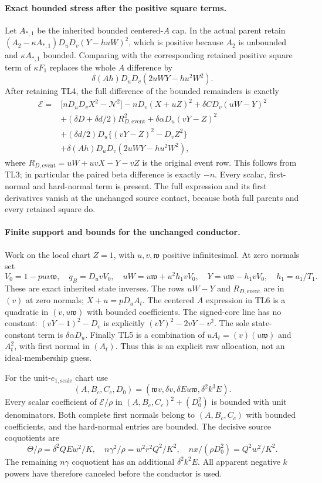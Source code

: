 \paragraph{Exact bounded stress after the positive square terms.}
Let $A_{*,1}$ be the inherited bounded centered-$A$ cap. In the actual
parent retain $(A_2-\kappa A_{*,1})D_uD_v(Y-huW)^2$, which is positive
because $A_2$ is unbounded and $\kappa A_{*,1}$ bounded. Comparing with
the corresponding retained positive square term of $\kappa F_1$ replaces the whole
$A$ difference by
\[
 \delta(Ah)D_uD_v(2uWY-hu^2W^2).
\]
After retaining TL4, the full difference of the bounded remainders is
exactly
\[
\begin{split}
 \mathscr E={}&\bigl[nD_uD_vX^2-\mathcal N^2\bigr]
   -nD_v(X+uZ)^2+\delta C D_v(uW-Y)^2\\
 &+(\delta D+\delta d/2)R_{D,\mathrm{event}}^2
   +\delta\alpha D_u(vY-Z)^2\\
 &+(\delta d/2)D_u\{(vY-Z)^2-D_vZ^2\}\\
 &+\delta(Ah)D_uD_v(2uWY-hu^2W^2),
\end{split}
\tag{TL6}
\]
where $R_{D,\mathrm{event}}=uW+uvX-Y-vZ$ is the original event
row. This follows from TL3; in particular the paired beta difference
is exactly $-n$. Every scalar, first-normal and hard-normal term is
present. The full expression and its first derivatives vanish at the
unchanged source contact, because both full parents and every retained
square do.

\paragraph{Finite support and bounds for the unchanged conductor.}
Work on the local chart $Z=1$, with $u,v,\mathfrak w$ positive
infinitesimal. At zero normals set
\[
 V_0=1-puv\mathfrak w,\quad q_B=D_uvV_0,\quad
 uW=u\mathfrak w+u^2h_1vV_0,\quad
 Y=u\mathfrak w-h_1vV_0,\quad h_1=a_1/T_1.
\tag{TL7}
\]
These are exact inherited state inverses. The rows $uW-Y$ and
$R_{D,\mathrm{event}}$ are in $(v)$ at zero normals;
$X+u=pD_uA_t$. The centered $A$ expression in TL6 is a quadratic
in $(v,u\mathfrak w)$ with bounded coefficients. The signed-core
line has no constant: $(vY-1)^2-D_v$ is explicitly
$(vY)^2-2vY-v^2$. The sole state-constant term is
$\delta\alpha D_u$. Finally TL5 is a combination of
$uA_t=(v)(u\mathfrak w)$ and $A_t^2$, with first normal in $(A_t)$.
Thus this is an explicit raw allocation, not an ideal-membership guess.

For the unit-$e_{1,\mathrm{scale}}$ chart use
\[
 (A,B_c,C_c,D_0)
 =(\mathfrak wv,\delta v,\delta E u\mathfrak w,\delta^2k^3E).
\]
Every scalar coefficient of $\mathscr E/\rho$ in
$(A,B_c,C_c)^2+(D_0^2)$ is bounded with unit denominators. Both complete
first normals belong to $(A,B_c,C_c)$ with bounded coefficients, and
the hard-normal entries are bounded. The decisive source coquotients
are
\[
 \Theta/\rho=\delta^2QEw^2/K,\quad
 n\gamma^2/\rho=w^2r^2Q^2/K^2,\quad
 nx/(\rho D_0^2)=Q^2w^2/K^2.
\tag{TL8}
\]
The remaining $n\gamma$ coquotient has an additional $\delta^2k^2E$.
All apparent negative $k$ powers have therefore canceled before the
conductor is used.

